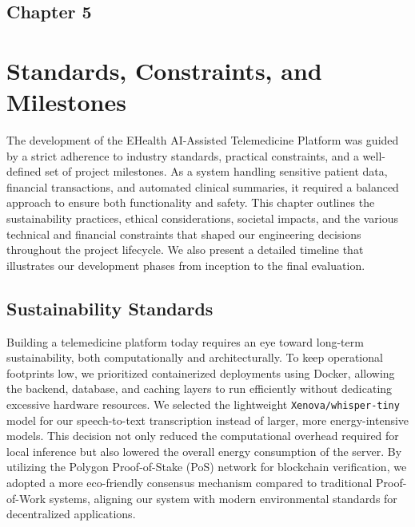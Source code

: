 \begin{center}
    \section*{\fontsize{20}{20}\selectfont Chapter 5}
\end{center}
\vspace{10mm}

\section{Standards, Constraints, and Milestones}

The development of the EHealth AI-Assisted Telemedicine Platform was guided by a strict adherence to industry standards, practical constraints, and a well-defined set of project milestones. As a system handling sensitive patient data, financial transactions, and automated clinical summaries, it required a balanced approach to ensure both functionality and safety. This chapter outlines the sustainability practices, ethical considerations, societal impacts, and the various technical and financial constraints that shaped our engineering decisions throughout the project lifecycle. We also present a detailed timeline that illustrates our development phases from inception to the final evaluation.

\subsection{Sustainability Standards}
Building a telemedicine platform today requires an eye toward long-term sustainability, both computationally and architecturally. To keep operational footprints low, we prioritized containerized deployments using Docker, allowing the backend, database, and caching layers to run efficiently without dedicating excessive hardware resources. We selected the lightweight \texttt{Xenova/whisper-tiny} model for our speech-to-text transcription instead of larger, more energy-intensive models. This decision not only reduced the computational overhead required for local inference but also lowered the overall energy consumption of the server. By utilizing the Polygon Proof-of-Stake (PoS) network for blockchain verification, we adopted a more eco-friendly consensus mechanism compared to traditional Proof-of-Work systems, aligning our system with modern environmental standards for decentralized applications.

